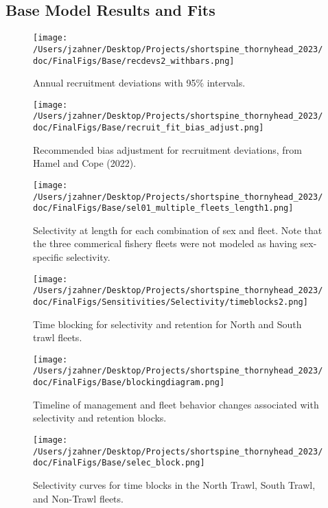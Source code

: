 \documentclass[11pt,
  english,
  letterpaper,
]{article}
\begin{document}
\hypertarget{base-model-results-and-fits}{%
\subsection{Base Model Results and Fits}\label{base-model-results-and-fits}}

\begin{figure}
\centering
\texttt{[image: /Users/jzahner/Desktop/Projects/shortspine\_thornyhead\_2023/doc/FinalFigs/Base/recdevs2\_withbars.png]}
\caption{Annual recruitment deviations with 95\% intervals.\label{fig:recdevs}}
\end{figure}

\begin{figure}
\centering
\texttt{[image: /Users/jzahner/Desktop/Projects/shortspine\_thornyhead\_2023/doc/FinalFigs/Base/recruit\_fit\_bias\_adjust.png]}
\caption{Recommended bias adjustment for recruitment deviations, from Hamel and Cope (2022).\label{fig:recdevs_bias_adjust}}
\end{figure}

\begin{figure}
\centering
\texttt{[image: /Users/jzahner/Desktop/Projects/shortspine\_thornyhead\_2023/doc/FinalFigs/Base/sel01\_multiple\_fleets\_length1.png]}
\caption{Selectivity at length for each combination of sex and fleet. Note that the three commerical fishery fleets were not modeled as having sex-specific selectivity.\label{fig:selcurvs}}
\end{figure}

\begin{figure}
\centering
\texttt{[image: /Users/jzahner/Desktop/Projects/shortspine\_thornyhead\_2023/doc/FinalFigs/Sensitivities/Selectivity/timeblocks2.png]}
\caption{Time blocking for selectivity and retention for North and South trawl fleets.\label{fig:timeblocks}}
\end{figure}

\begin{figure}
\centering
\texttt{[image: /Users/jzahner/Desktop/Projects/shortspine\_thornyhead\_2023/doc/FinalFigs/Base/blockingdiagram.png]}
\caption{Timeline of management and fleet behavior changes associated with selectivity and retention blocks.\label{fig:diagram}}
\end{figure}

\begin{figure}
\centering
\texttt{[image: /Users/jzahner/Desktop/Projects/shortspine\_thornyhead\_2023/doc/FinalFigs/Base/selec\_block.png]}
\caption{Selectivity curves for time blocks in the North Trawl, South Trawl, and Non-Trawl fleets.\label{fig:selblocks}}
\end{figure}
\end{document}
